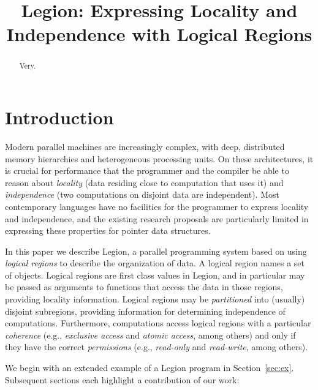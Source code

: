 \documentclass[9pt,nocopyrightspace]{sigplanconf}
\begin{document}
\title{Legion: Expressing Locality and Independence with Logical Regions}
\authorinfo{}{}{}
\maketitle

\begin{abstract}
Very.
\end{abstract}

\section{Introduction}
\label{sect:intro}
Modern parallel machines are increasingly complex, with deep,
distributed memory hierarchies and heterogeneous processing units.  On
these architectures, it is crucial for performance that the programmer
and the compiler be able to reason about {\em locality} (data residing
close to computation that uses it) and {\em independence} (two
computations on disjoint data are independent).  Most contemporary
languages have no facilities for the programmer to express locality
and independence, and the existing research proposals are particularly
limited in expressing these properties for pointer data structures.

In this paper we describe Legion, a parallel programming system based
on using {\em logical regions} to describe the organization of data.
A logical region names a set of objects.  Logical regions are first
class values in Legion, and in particular may be passed as arguments
to functions that access the data in those regions, providing locality
information.  Logical regions may be {\em partitioned} into (usually)
disjoint subregions, providing information for determining independence of computations.  Furthermore,
computations access logical regions with a particular {\em coherence}
(e.g., {\em exclusive access} and {\em atomic access}, among others)
and only if they have the correct {\em permissions} (e.g., {\em
  read-only} and {\em read-write}, among others).

We begin with an extended example of a Legion program in Section~\ref{sec:ex}.
Subsequent sections each highlight a contribution of our work:
 
\end{document}
